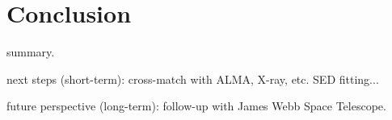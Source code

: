 \section{Conclusion}

summary.

next steps (short-term): cross-match with ALMA, X-ray, etc. SED fitting...

future perspective (long-term):  follow-up with James Webb Space Telescope.

